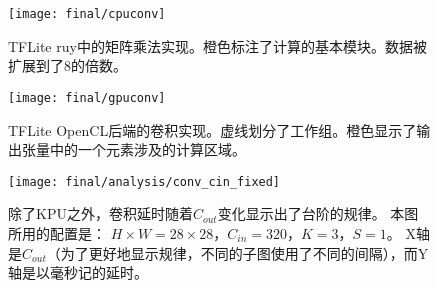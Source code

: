 \begin{figure}[htbp]
    \centering
    \texttt{[image: final/cpuconv]}
    \caption{TFLite ruy中的矩阵乘法实现。橙色标注了计算的基本模块。数据被扩展到了8的倍数。}
    \label{fig:cpuconv}
\end{figure}

\begin{figure}[htbp]
    \centering
    \texttt{[image: final/gpuconv]}
    \caption{TFLite OpenCL后端的卷积实现。虚线划分了工作组。橙色显示了输出张量中的一个元素涉及的计算区域。}
    \label{fig:gpuconv}
\end{figure}

\begin{figure}[htbp]
	\centering
	\texttt{[image: final/analysis/conv\_cin\_fixed]}
	\caption{
        除了KPU之外，卷积延时随着$C_{out}$变化显示出了台阶的规律。
        本图所用的配置是：
        $H \times W=28 \times 28$，$C_{in}=320$，$K=3$，$S=1$。
        X轴是$C_{out}$（为了更好地显示规律，不同的子图使用了不同的间隔），而Y轴是以毫秒记的延时。
	}
	\label{fig:conv_cin_fixed}
\end{figure}